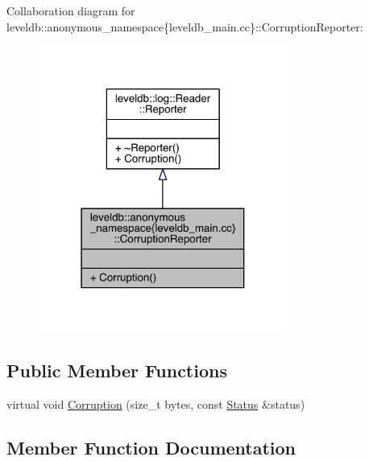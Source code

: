 Collaboration diagram for leveldb\+:\+:anonymous\+\_\+namespace\{leveldb\+\_\+main.\+cc\}\+:\+:Corruption\+Reporter\+:
\nopagebreak
\begin{figure}[H]
\begin{center}
\leavevmode
\includegraphics[width=232pt]{classleveldb_1_1anonymous__namespace_02leveldb__main_8cc_03_1_1_corruption_reporter__coll__graph}
\end{center}
\end{figure}
\subsection*{Public Member Functions}
\begin{DoxyCompactItemize}
\item 
virtual void \hyperlink{classleveldb_1_1anonymous__namespace_02leveldb__main_8cc_03_1_1_corruption_reporter_a802aca751cc0d66ae8e44fcbeb3f46cb}{Corruption} (size\+\_\+t bytes, const \hyperlink{classleveldb_1_1_status}{Status} \&status)
\end{DoxyCompactItemize}


\subsection{Member Function Documentation}
\hypertarget{classleveldb_1_1anonymous__namespace_02leveldb__main_8cc_03_1_1_corruption_reporter_a802aca751cc0d66ae8e44fcbeb3f46cb}{}
